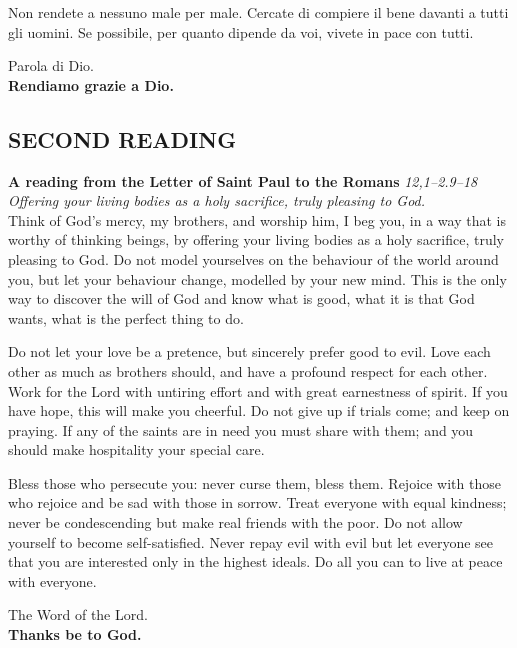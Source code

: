 \documentclass[10pt,b6paper,usenames,twoside]{article}
\begin{document}
Non rendete a nessuno male per male. Cercate di compiere il bene davanti a tutti gli uomini. Se possibile, per quanto dipende da voi, vivete in pace con tutti. 

\noindent Parola di Dio.\\ \textbf{Rendiamo grazie a Dio.}
 
\subsection*{\textcolor{forestgreen(traditional)}{SECOND READING}} 
\noindent \textbf{A reading from the Letter of Saint Paul to the Romans} \hfill \textcolor{forestgreen(traditional)}{\textit{12,1--2.9--18}}\\ 
\textcolor{forestgreen(traditional)}{\textit{\footnotesize{Offering your living bodies as a holy sacrifice, truly pleasing to God.}}}\\ 

Think of God's mercy, my brothers, and worship him, I beg you, in a way that is worthy of thinking beings, by offering your living bodies as a holy sacrifice, truly pleasing to God. Do not model yourselves on the behaviour of the world around you, but let your behaviour change, modelled by your new mind. This is the only way to discover the will of God and know what is good, what it is that God wants, what is the perfect thing to do. 

Do not let your love be a pretence, but sincerely prefer good to evil. Love each other as much as brothers should, and have a profound respect for each other. Work for the Lord with untiring effort and with great earnestness of spirit. If you have hope, this will make you cheerful. Do not give up if trials come; and keep on praying. If any of the saints are in need you must share with them; and you should make hospitality your special care.

Bless those who persecute you: never curse them, bless them. Rejoice with those who rejoice and be sad with those in sorrow. Treat everyone with equal kindness; never be condescending but make real friends with the poor. Do not allow yourself to become self-satisfied. Never repay evil with evil but let everyone see that you are interested only in the highest ideals. Do all you can to live at peace with everyone.  

\noindent The Word of the Lord.\\ \textbf{Thanks be to God.}\\
\end{document}
